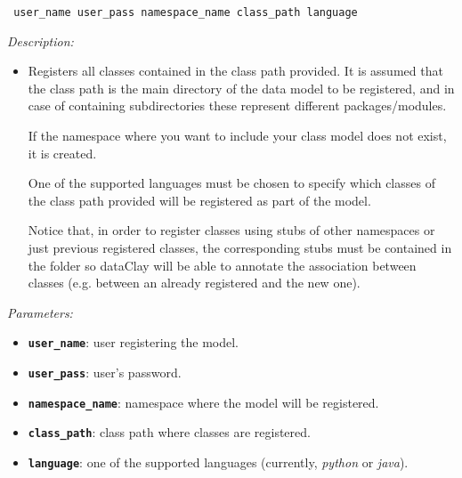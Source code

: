 
\begin{dBox}
\texttt{ \newline user\_name user\_pass namespace\_name class\_path language 
}
\LINE

{\it Description:}

\begin{itemize}
    \item Registers all classes contained in the class path provided. It is assumed that the class path is the main directory of the data model to be registered, and in case of containing subdirectories these represent different packages/modules.
    
    If the namespace where you want to include your class model does not exist, it is created.
    
    One of the supported languages must be chosen to specify which classes of the class path provided will be registered as part of the model.
    
    Notice that, in order to register classes using stubs of other namespaces or just previous registered classes, the corresponding stubs must be contained in the folder so dataClay will be able to annotate the association between classes (e.g. between an already registered and the new one).
   
\end{itemize}

{\it Parameters:}

\begin{itemize}
    \item \texttt{\bfseries user\_name}: user registering the model.
    \item \texttt{\bfseries user\_pass}: user's password.
    \item \texttt{\bfseries namespace\_name}: namespace where the model will be registered.
    \item \texttt{\bfseries class\_path}: class path where classes are registered.
    \item \texttt{\bfseries language}: one of the supported languages (currently, \textit{python} or \textit{java}).
\end{itemize}


\end{dBox}
